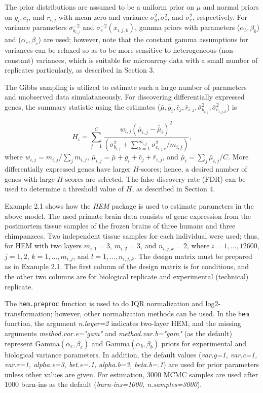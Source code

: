 \documentclass[12pt]{article}
\newcommand{\Rfunction}[1]{{\texttt{#1}}}
\newcommand{\Rpackage}[1]{{\textit{#1}}}
\newcommand{\Rfunarg}[1]{{\textit{#1}}}
\begin{document}
The prior distributions are assumed to be a uniform prior on $\mu$ and normal priors on
$g_i, c_j$, and $r_{i,j}$ with mean zero and variance
$\sigma_g^2, \sigma_c^2$, and $\sigma^2_r$, respectively.
For variance parameters $\sigma_{b_{i,j}}^{-2}$ and $\sigma^{-2}_e(x_{i,j,k})$, 
gamma priors with parameters ($\alpha_b, \beta_b$) and ($\alpha_e, \beta_e$) are used; 
however, note that the constant gamma assumptions for variances can be relaxed 
so as to be more sensitive to heterogeneous (non-constant) variances, which is suitable for
 microarray data with a small number of replicates particularly, as described in Section 3.  


 The Gibbs sampling is utilized to estimate such a large number of parameters and unobserved data simulataneously.
For discovering differentially expressed genes,  the summary statistic using the estimates 
($\bar\mu, \bar{g}_i, \bar{c}_j, \bar{r}_{i,j}, \bar{\sigma}^2_{b_{i,j}}, \bar{\sigma}^2_{e_{i,j,k}}$)  is

\[
H_i = \sum_{j=1}^C  \frac{ w_{i,j} (\bar{\mu}_{i,j}-\bar{\bar{\mu}}_{i})^2}
           {(\bar{\sigma}^2_{b_{i,j}} + \sum_{k=1}^{m_{i,j}} \bar{\sigma}^2_{e_{i,j,k}}/m_{i,j})},
\]
where $w_{i,j}=m_{i,j}/\sum_j m_{i,j}$,
$\bar{\mu}_{i,j} = \bar\mu + \bar{g}_i + \bar{c}_j + \bar{r}_{i,j}$, and
$\bar{\bar{\mu}}_{i}=\sum_j \bar{\mu}_{i,j}/C$.
More differentially expressed genes have larger $H$-scores; hence, 
a desired number of genes with large $H$-scores are selected. 
The false discovery rate (FDR) can be used to determine a threshold value of $H$, as described in Section 4.  


Example 2.1 shows how the \Rpackage{HEM} package is used to estimate parameters in the above model. 
The used primate brain data consists of gene expression 
from the postmortem tissue samples of the frozen brains of three humans and three chimpanzees. 
Two independent tissue samples for each individual were used; thus, for HEM with two layers
$m_{i,1}=3$, $m_{i,2}=3$, and $n_{i,j,k}=2$,
where $i=1, \ldots, 12600$, $j=1,2$, $k=1, \ldots, m_{i,j}$, and $l=1, \ldots, n_{i,j,k}$. 
The design matrix must be prepared as in Example 2.1.
The first column of the design matrix is for conditions, and the other two columns are for biological replicate 
and experimental (technical) replicate.

The \Rfunction{hem.preproc} function is used to do IQR normalization and log2-transformation; 
however, other normalization methods can be used.
In the \Rfunction{hem} function, the argument  \Rfunarg{n.layer=2} indicates two-layer HEM, and 
the missing arguments \Rfunarg{method.var.e="gam"} and  \Rfunarg{method.var.b="gam"} (as the default) represent 
$\mbox{Gamma}(\alpha_e,\beta_e)$ and $\mbox{Gamma}(\alpha_b,\beta_b)$ priors
for experimental and biological variance parameters. 
In addition, the default values (\Rfunarg{var.g=1, var.c=1, var.r=1, alpha.e=3, bet.e=.1, alpha.b=3, beta.b=.1}) 
are used for prior parameters unless other values are given.
For estimation, 3000 MCMC samples are used after 1000 burn-ins as the default (\Rfunarg{burn-ins=1000, n.samples=3000}).  
 
\end{document}

